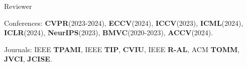 


\begin{cventries}
\cvpub
{Reviewer} %
{ %
\begin{cvitems}
    \item {Conferences: \textbf{CVPR}(2023-2024), \textbf{ECCV}(2024), \textbf{ICCV}(2023), \textbf{ICML}(2024), \textbf{ICLR}(2024), \textbf{NeurIPS}(2023), \textbf{BMVC}(2020-2023), \textbf{ACCV}(2024).}
    \item {Journals: IEEE \textbf{TPAMI}, IEEE \textbf{TIP}, \textbf{CVIU}, IEEE \textbf{R-AL}, ACM \textbf{TOMM}, \textbf{JVCI}, \textbf{JCISE}.}
\end{cvitems}
}
\end{cventries}

